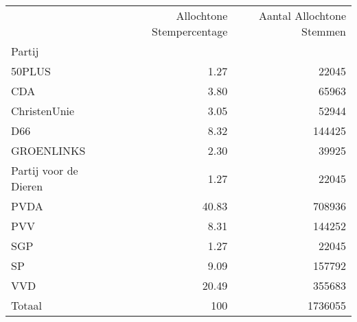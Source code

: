 \begin{tabular}{lrr}
\toprule
{} &  Allochtone Stempercentage &  Aantal Allochtone Stemmen \\
Partij                &                            &                            \\
\midrule
50PLUS                &                       1.27 &                      22045 \\
CDA                   &                       3.80 &                      65963 \\
ChristenUnie          &                       3.05 &                      52944 \\
D66                   &                       8.32 &                     144425 \\
GROENLINKS            &                       2.30 &                      39925 \\
Partij voor de Dieren &                       1.27 &                      22045 \\
PVDA                  &                      40.83 &                     708936 \\
PVV                   &                       8.31 &                     144252 \\
SGP                   &                       1.27 &                      22045 \\
SP                    &                       9.09 &                     157792 \\
VVD                   &                      20.49 &                     355683 \\
\midrule
Totaal				& 						100 & 			1736055 \\
\bottomrule
\end{tabular}


